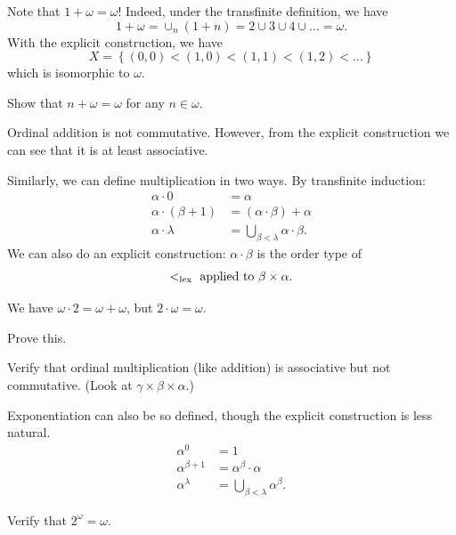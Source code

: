 \begin{example}
	Note that $1 + \omega = \omega$!
	Indeed, under the transfinite definition, we have
	\[ 1 + \omega = \cup_n (1+n) = 2 \cup 3 \cup 4 \cup \dots = \omega. \]
	With the explicit construction, we have
	\[ X = \left\{ (0,0) < (1,0) < (1,1) < (1,2) < \dots \right\} \]
	which is isomorphic to $\omega$.
\end{example}
\begin{exercise}
	Show that $n+\omega = \omega$ for any $n \in \omega$.
\end{exercise}

\begin{remark}
	Ordinal addition is not commutative.
	However, from the explicit construction
	we can see that it is at least associative.
\end{remark}

Similarly, we can define multiplication in two ways.
By transfinite induction:
\begin{align*}
	\alpha \cdot 0 &= \alpha \\
	\alpha \cdot (\beta + 1) &= (\alpha \cdot \beta) + \alpha \\
	\alpha \cdot \lambda &= \bigcup_{\beta < \lambda} \alpha \cdot \beta.
\end{align*}
We can also do an explicit construction: $\alpha \cdot \beta$
is the order type of
\[ <_{\text{lex}} \text{ applied to } \beta \times \alpha. \]
\begin{example}
	We have $\omega \cdot 2 = \omega + \omega$,
	but $2 \cdot \omega = \omega$.
\end{example}
\begin{exercise}
	Prove this.
\end{exercise}
\begin{exercise}
	Verify that ordinal multiplication
	(like addition) is associative but not commutative.
	(Look at $\gamma \times \beta \times \alpha$.)
\end{exercise}

Exponentiation can also be so defined, though the explicit construction is less natural.
\begin{align*}
	\alpha^0 &= 1 \\
	\alpha^{\beta+1} &= \alpha^{\beta} \cdot \alpha \\
	\alpha^{\lambda} &= \bigcup_{\beta < \lambda} \alpha^\beta.
\end{align*}
\begin{exercise}
	Verify that $2^\omega = \omega$.
\end{exercise}


